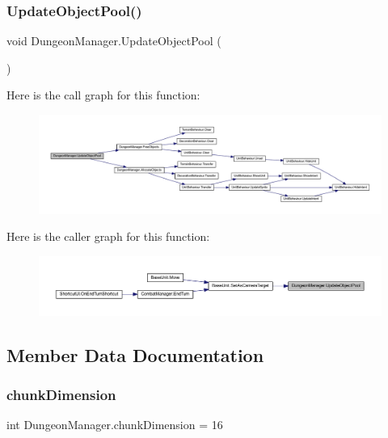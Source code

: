 \subsubsection{\texorpdfstring{UpdateObjectPool()}{UpdateObjectPool()}}
{\footnotesize\ttfamily void Dungeon\+Manager.\+Update\+Object\+Pool (\begin{DoxyParamCaption}{ }\end{DoxyParamCaption})}

Here is the call graph for this function\+:
\nopagebreak
\begin{figure}[H]
\begin{center}
\leavevmode
\includegraphics[width=350pt]{class_dungeon_manager_a980762c66ae4ae92ce3d8caa42f7fe61_cgraph}
\end{center}
\end{figure}
Here is the caller graph for this function\+:
\nopagebreak
\begin{figure}[H]
\begin{center}
\leavevmode
\includegraphics[width=350pt]{class_dungeon_manager_a980762c66ae4ae92ce3d8caa42f7fe61_icgraph}
\end{center}
\end{figure}


\subsection{Member Data Documentation}
\mbox{\label{class_dungeon_manager_a36a67a913c6a4b58b2f32094c23df9e2}} 
\subsubsection{\texorpdfstring{chunkDimension}{chunkDimension}}
{\footnotesize\ttfamily int Dungeon\+Manager.\+chunk\+Dimension = 16\hspace{0.3cm}{\ttfamily [static]}}

